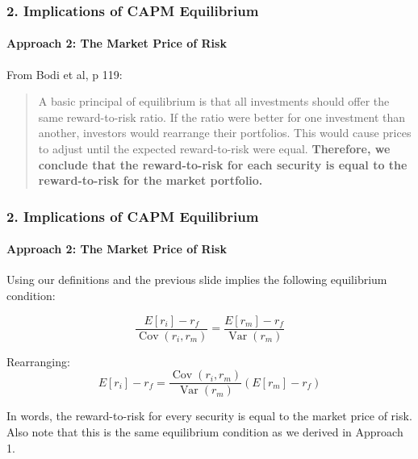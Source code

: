 \documentclass{beamer}
\begin{document}
\begin{frame}[t]
    \frametitle{2. Implications of CAPM Equilibrium}
    \framesubtitle{Approach 2: The Market Price of Risk}

    From Bodi et al, p 119:
    \vspace{1em}

    \begin{quote}
    A basic principal of equilibrium is that all investments should offer the same reward-to-risk ratio.
    If the ratio were better for one investment than another, investors would rearrange their portfolios.
    This would cause prices to adjust until the expected reward-to-risk were equal.
    \textbf{Therefore, we conclude that the reward-to-risk for each security is equal to the reward-to-risk for the market portfolio.}
    \end{quote}


\end{frame}

\begin{frame}[t]
    \frametitle{2. Implications of CAPM Equilibrium}
    \framesubtitle{Approach 2: The Market Price of Risk}


    Using our definitions and the previous slide implies the following equilibrium condition:

    $$\frac{E[r_{i}]-r_f}{\operatorname{Cov}(r_i,r_m)} = \frac{E[r_m]-r_f}{\operatorname{Var}(r_m)}$$
    
    Rearranging:
    $$E[r_i] - r_f = \frac{\operatorname{Cov}(r_i,r_m)}{\operatorname{Var}(r_m)}(E[r_m]-r_f)$$
    \vspace{1em} 

    In words, the reward-to-risk for every security is equal to the market price of risk.  Also note that this is the same equilibrium condition as we derived in Approach 1.

\end{frame}
\end{document}
